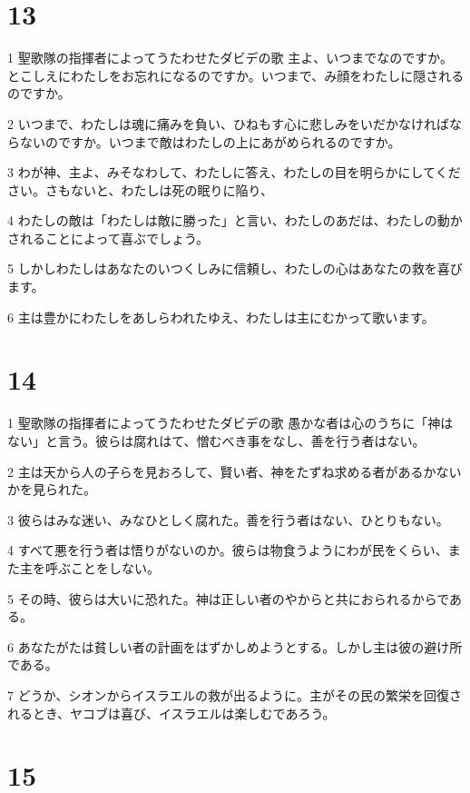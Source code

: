 \chapter{13}

\par 1 聖歌隊の指揮者によってうたわせたダビデの歌 主よ、いつまでなのですか。とこしえにわたしをお忘れになるのですか。いつまで、み顔をわたしに隠されるのですか。
\par 2 いつまで、わたしは魂に痛みを負い、ひねもす心に悲しみをいだかなければならないのですか。いつまで敵はわたしの上にあがめられるのですか。
\par 3 わが神、主よ、みそなわして、わたしに答え、わたしの目を明らかにしてください。さもないと、わたしは死の眠りに陥り、
\par 4 わたしの敵は「わたしは敵に勝った」と言い、わたしのあだは、わたしの動かされることによって喜ぶでしょう。
\par 5 しかしわたしはあなたのいつくしみに信頼し、わたしの心はあなたの救を喜びます。
\par 6 主は豊かにわたしをあしらわれたゆえ、わたしは主にむかって歌います。

\chapter{14}

\par 1 聖歌隊の指揮者によってうたわせたダビデの歌 愚かな者は心のうちに「神はない」と言う。彼らは腐れはて、憎むべき事をなし、善を行う者はない。
\par 2 主は天から人の子らを見おろして、賢い者、神をたずね求める者があるかないかを見られた。
\par 3 彼らはみな迷い、みなひとしく腐れた。善を行う者はない、ひとりもない。
\par 4 すべて悪を行う者は悟りがないのか。彼らは物食うようにわが民をくらい、また主を呼ぶことをしない。
\par 5 その時、彼らは大いに恐れた。神は正しい者のやからと共におられるからである。
\par 6 あなたがたは貧しい者の計画をはずかしめようとする。しかし主は彼の避け所である。
\par 7 どうか、シオンからイスラエルの救が出るように。主がその民の繁栄を回復されるとき、ヤコブは喜び、イスラエルは楽しむであろう。

\chapter{15}


